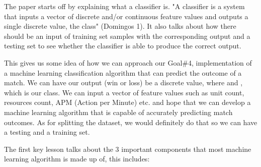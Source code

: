 \documentclass[a4paper,12pt]{report}
\begin{document}
The paper starts off by explaining what a classifier is. "A classifier is a system that inputs a vector of discrete and/or continuous feature values and outputs a single discrete value, the class" (Domingos 1). It also talks about how there should be an input of training set samples with the corresponding output and a testing set to see whether the classifier is able to produce the correct output.

This gives us some idea of how we can approach our Goal\#4, implementation of a machine learning classification algorithm that can predict the outcome of a match. We can have our output (win or loss) be a discrete value, where  and , which is our class. We can input a vector of feature values such as unit count, resources count, APM (Action per Minute) etc. and hope that we can develop a machine learning algorithm that is capable of accurately predicting match outcomes. As for splitting the dataset, we would definitely do that so we can have a testing and a training set.

The first key lesson talks about the 3 important components that most machine learning algorithm is made up of, this includes:
\end{document}
